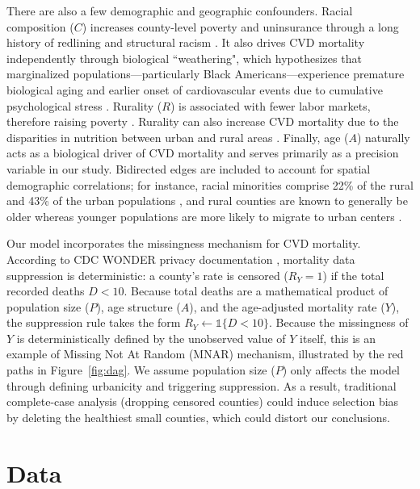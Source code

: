 \documentclass{article}
\theoremstyle{plain}
\theoremstyle{definition}
\theoremstyle{remark}
\begin{document}
There are also a few demographic and geographic confounders. Racial 
composition ($C$) increases county-level poverty and uninsurance through a long history of redlining and structural racism \citep{bailey2021structural, lee2021convergence}. 
It also drives CVD mortality independently through biological ``weathering", which hypothesizes 
that marginalized populations—particularly Black Americans—experience premature 
biological aging and earlier onset of cardiovascular events due to cumulative 
psychological stress \citep{geronimus2006weathering}. Rurality ($R$) is associated with fewer labor markets, therefore 
raising poverty \citep{farrigan2026rural}. Rurality can also increase
CVD mortality due to the disparities in nutrition between urban and rural areas \citep{loccoh2022rural}. Finally, age ($A$) naturally acts as a 
biological driver of CVD mortality and serves primarily as a precision variable in our study.
Bidirected edges are included to account for spatial demographic correlations; for instance, 
racial minorities comprise 22\% of the rural and 43\% of the urban populations 
\citep{castillo2020racial}, and rural counties are known to generally be older whereas 
younger populations are more likely to migrate to urban centers \citep{monnat2025us, cohen2023aging}.

Our model incorporates the missingness mechanism for CVD 
mortality. According to CDC WONDER privacy documentation \citep{cdc_wonder_cmf_doc}, 
mortality data suppression is deterministic: a county's rate is censored 
($R_Y = 1$) if the total recorded deaths $D < 10$. Because total deaths are a
mathematical product of population size ($P$), age structure ($A$), and the age-adjusted mortality rate ($Y$), the suppression rule takes 
the form $R_Y \leftarrow \mathds{1}\{D < 10\}$. Because the missingness of $Y$ is deterministically defined by the unobserved value of $Y$ itself, this is an example of
Missing Not At Random (MNAR) mechanism, illustrated by the red paths in Figure~\ref{fig:dag}. 
We assume population size ($P$) only affects the model through defining urbanicity 
and triggering suppression. As a result, traditional complete-case 
analysis (dropping censored counties) could induce selection bias by deleting the healthiest small counties, which could distort our conclusions.




\section{Data}
\label{data}
\end{document}
